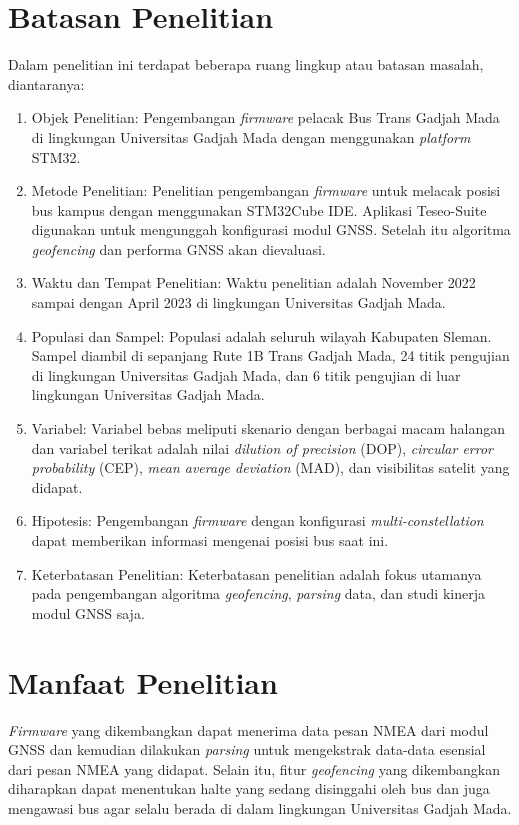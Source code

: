 \section{Batasan Penelitian}
Dalam penelitian ini terdapat beberapa ruang lingkup atau batasan masalah, diantaranya:
\begin{enumerate}
	\item Objek Penelitian: Pengembangan \textit{firmware} pelacak Bus Trans Gadjah Mada di lingkungan Universitas Gadjah Mada dengan menggunakan \textit{platform} STM32.
	\item Metode Penelitian: Penelitian pengembangan \textit{firmware} untuk melacak posisi bus kampus dengan menggunakan STM32Cube IDE. Aplikasi Teseo-Suite digunakan untuk mengunggah konfigurasi modul GNSS. Setelah itu algoritma \textit{geofencing} dan performa GNSS akan dievaluasi.
	\item Waktu dan Tempat Penelitian: Waktu penelitian adalah November 2022 sampai dengan April 2023 di lingkungan Universitas Gadjah Mada.
	\item Populasi dan Sampel: Populasi adalah seluruh wilayah Kabupaten Sleman. Sampel diambil di sepanjang Rute 1B Trans Gadjah Mada, 24 titik pengujian di lingkungan Universitas Gadjah Mada, dan 6 titik pengujian di luar lingkungan Universitas Gadjah Mada.
	\item Variabel: Variabel bebas meliputi skenario dengan berbagai macam halangan dan variabel terikat adalah nilai \textit{dilution of precision} (DOP), \textit{circular error probability} (CEP), \textit{mean average deviation} (MAD), dan visibilitas satelit yang didapat.
	\item Hipotesis: Pengembangan \textit{firmware} dengan konfigurasi \textit{multi-constellation} dapat memberikan informasi mengenai posisi bus saat ini.
	\item Keterbatasan Penelitian: Keterbatasan penelitian adalah fokus utamanya pada pengembangan algoritma \textit{geofencing}, \textit{parsing} data, dan studi kinerja modul GNSS saja.
\end{enumerate}

\section{Manfaat Penelitian}
\textit{Firmware} yang dikembangkan dapat menerima data pesan NMEA dari modul GNSS dan kemudian dilakukan \textit{parsing} untuk mengekstrak data-data esensial dari pesan NMEA yang didapat. Selain itu, fitur \textit{geofencing} yang dikembangkan diharapkan dapat menentukan halte yang sedang disinggahi oleh bus dan juga mengawasi bus agar selalu berada di dalam lingkungan Universitas Gadjah Mada.

